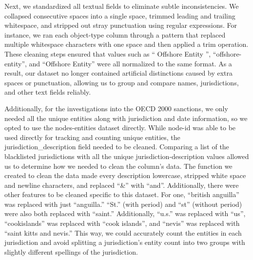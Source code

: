 \documentclass{article}
\begin{document}
Next, we standardized all textual fields to eliminate subtle inconsistencies. We collapsed consecutive spaces into a single space, trimmed leading and trailing whitespace, and stripped out stray punctuation using regular expressions. For instance, we ran each object-type column through a pattern that replaced multiple whitespace characters with one space and then applied a trim operation. These cleaning steps ensured that values such as “ Offshore Entity ”, “offshore-entity”, and “Offshore Entity” were all normalized to the same format. As a result, our dataset no longer contained artificial distinctions caused by extra spaces or punctuation, allowing us to group and compare names, jurisdictions, and other text fields reliably.

Additionally, for the investigations into the OECD 2000 sanctions, we only needed all the unique entities along with jurisdiction and date information, so we opted to use the nodes-entities dataset directly. While node-id was able to be used directly for tracking and counting unique entities, the jurisdiction\_description field needed to be cleaned. Comparing a list of the blacklisted jurisdictions with all the unique jurisdiction-description values allowed us to determine how we needed to clean the column’s data. The function we created to clean the data made every description lowercase, stripped white space and newline characters, and replaced “\&” with “and”. Additionally, there were other features to be cleaned specific to this dataset. For one, “british anguilla” was replaced with just “anguilla.” “St.” (with period) and “st” (without period) were also both replaced with “saint.” Additionally, “u.s.” was replaced with “us”, “cookislands” was replaced with “cook islands”, and “nevis” was replaced with “saint kitts and nevis.” This way, we could accurately count the entities in each jurisdiction and avoid splitting a jurisdiction’s entity count into two groups with slightly different spellings of the jurisdiction.
\end{document}
